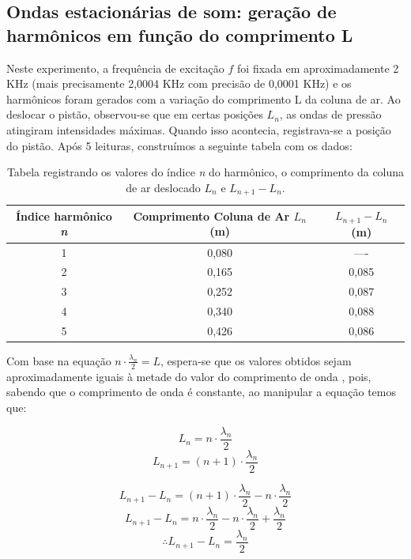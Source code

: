 \subsection{Ondas estacionárias de som: geração de harmônicos em
função do comprimento L}

Neste experimento, a frequência de excitação $f$ foi fixada em aproximadamente 2 KHz (mais precisamente 2,0004 KHz com precisão de 0,0001 KHz) e os harmônicos foram gerados com a variação do comprimento L da coluna de ar. Ao deslocar o pistão, observou-se que em certas posições $L_n$, as ondas de pressão atingiram intensidades máximas. Quando isso acontecia, registrava-se a posição do pistão. Após 5 leituras, construímos a seguinte tabela com os dados:

\begin{table}[H]
    \centering
    \begin{tabular}{ |c||c||c|}
        \hline
        \textbf{Índice harmônico \textit{n}} & \textbf{Comprimento Coluna de Ar \textit{$L_n$}(m)} & \textbf{$L_{n+1} - L_n$ (m)}\\
        \hline 
         1&	0,080&	----	\\
         
         2&	0,165&	0,085 \\
         
         3&	0,252&	0,087 \\
         
         4&	0,340&	0,088 \\
         
         5&	0,426&	0,086 \\
        \hline
    \end{tabular}
    \caption{Tabela registrando os valores do índice \textit{n} do harmônico, o comprimento da coluna de ar deslocado \textit{$L_n$} e \textit{$L_{n+1} - L_n$}.}
\end{table}

Com base na equação $n \cdot \frac{\lambda_n}{2}=L$, espera-se que os valores obtidos sejam aproximadamente iguais à metade do valor do comprimento de onda , pois, sabendo que o comprimento de onda  é constante, ao manipular a equação temos que:

\[ L_n = n \cdot \frac{\lambda_n}{2}\] 
\[L_{n+1} = (n+1) \cdot \frac{\lambda_n}{2}\]

\[L_{n+1} - L_n = (n+1) \cdot \frac{\lambda_n}{2} - n \cdot \frac{\lambda_n}{2}\] 
\[L_{n+1} - L_n = n \cdot \frac{\lambda_n}{2} - n \cdot \frac{\lambda_n}{2} + \frac{\lambda_n}{2}\] 
\[\therefore L_{n+1} - L_n = \frac{\lambda_n}{2}\] 

